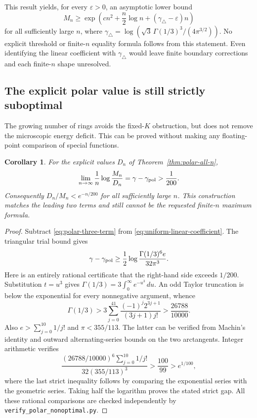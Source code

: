 \documentclass[11pt]{article}
\newtheorem{corollary}[theorem]{Corollary}
\theoremstyle{remark}
\numberwithin{equation}{section}
\begin{document}
This result yields, for every $\varepsilon>0$, an asymptotic lower bound
\[
 M_n\ge\exp\left(cn^2+\frac n2\log n+
 (\gamma_\triangle-\varepsilon)n\right)
\]
for all sufficiently large $n$, where
$\gamma_\triangle=\log(\sqrt3\,\Gamma(1/3)^3/(4\pi^{3/2}))$.
No explicit threshold or finite-$n$ equality formula follows from this
statement. Even identifying the linear coefficient with
$\gamma_\triangle$ would leave finite boundary corrections and each
finite-$n$ shape unresolved.

\subsection{The explicit polar value is still strictly suboptimal}
The growing number of rings avoids the fixed-$K$ obstruction, but does
not remove the microscopic energy deficit. This can be proved without
making any floating-point comparison of special functions.
\begin{corollary}\label{cor:polar-linear-deficit}
For the explicit values $D_n$ of Theorem~\ref{thm:polar-all-n},
\[
 \lim_{n\to\infty}\frac1n\log\frac{M_n}{D_n}
   =\gamma-\gamma_{\rm pol}>\frac1{200}.
\]
Consequently $D_n/M_n<e^{-n/200}$ for all sufficiently large $n$.
This construction matches the leading two terms and still cannot
be the requested finite-$n$ maximum formula.
\end{corollary}
\begin{proof}
Subtract \eqref{eq:polar-three-term} from
\eqref{eq:uniform-linear-coefficient}. The triangular trial bound gives
\[
 \gamma-\gamma_{\rm pol}\ge
 \frac12\log\frac{\Gamma(1/3)^6e}{32\pi^3}.
\]
Here is an entirely rational certificate that the right-hand side
exceeds $1/200$. Substitution $t=u^3$ gives
$\Gamma(1/3)=3\int_0^\infty e^{-u^3}\,du$. An odd Taylor truncation
is below the exponential for every nonnegative argument, whence
\[
 \Gamma(1/3)>3\sum_{j=0}^{41}
 \frac{(-1)^j2^{3j+1}}{(3j+1)j!}>\frac{26788}{10000}.
\]
Also $e>\sum_{j=0}^{10}1/j!$ and $\pi<355/113$. The latter can
be verified from Machin's identity and outward alternating-series
bounds on the two arctangents. Integer arithmetic verifies
\[
 \frac{(26788/10000)^6\sum_{j=0}^{10}1/j!}
      {32(355/113)^3}>\frac{100}{99}>e^{1/100},
\]
where the last strict inequality follows by comparing the exponential
series with the geometric series. Taking half the logarithm proves
the stated strict gap. All these rational comparisons are checked
independently by \texttt{verify\_polar\_nonoptimal.py}.
\end{proof}
\end{document}
